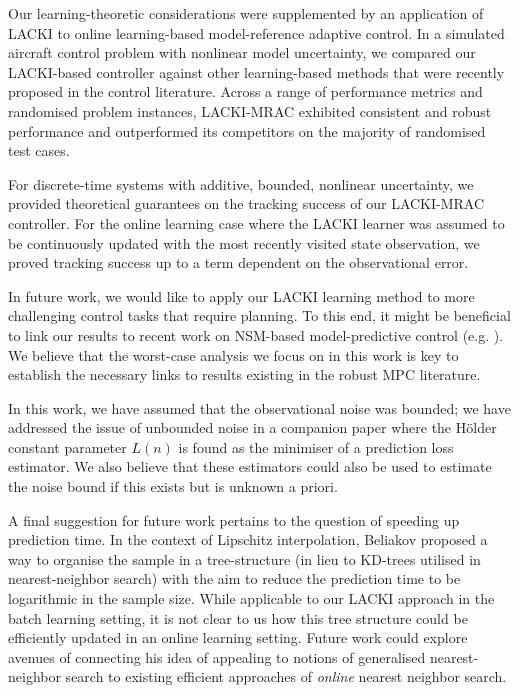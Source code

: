 \documentclass{article} %
\theoremstyle{definition}
\theoremstyle{remark}
\begin{document}
Our learning-theoretic considerations were supplemented by an application of LACKI to 
online learning-based model-reference adaptive control. In a simulated aircraft control problem with nonlinear model uncertainty, we compared our LACKI-based controller against other learning-based methods that were recently proposed in the control literature. Across a range of performance metrics and randomised problem instances, LACKI-MRAC exhibited consistent and robust performance and outperformed its competitors on the majority of randomised test cases.

For discrete-time systems with additive, bounded, nonlinear uncertainty, we provided theoretical guarantees on the tracking success of our LACKI-MRAC controller. For the online learning case where the LACKI learner was assumed to be continuously updated with the most recently visited state observation, we proved tracking success up to a term dependent on the observational error. 


In future work, we would like to apply our LACKI learning method to more challenging control tasks that require planning.
To this end, it might be beneficial to link our results to recent work on NSM-based model-predictive control (e.g. \cite{Canale2014}). We believe that the worst-case analysis we focus on in this work is key to establish the necessary links to results existing in the robust MPC literature.

In this work, we have assumed that the observational noise was bounded; we have addressed the issue of unbounded noise in a companion paper \cite{POKIdraft2016} where the H\"older constant parameter $L(n)$ is found as the minimiser of a prediction loss estimator.  We also believe that these estimators could also be used to estimate the noise bound if this exists but is  unknown a priori.

A final suggestion for future work pertains to the question of speeding up prediction time. In the context of Lipschitz interpolation, Beliakov \cite{Beliakov2006} proposed a way to organise the sample in a tree-structure (in lieu to KD-trees utilised in nearest-neighbor search) with the aim to reduce the prediction time to be logarithmic in the sample size. While applicable to our LACKI approach in the batch learning setting, it is not clear to us how this tree structure could be efficiently updated in an online learning setting. Future work could explore avenues of connecting his idea of appealing to notions of generalised nearest-neighbor search to existing efficient approaches of \emph{online} nearest neighbor search.
\end{document}
